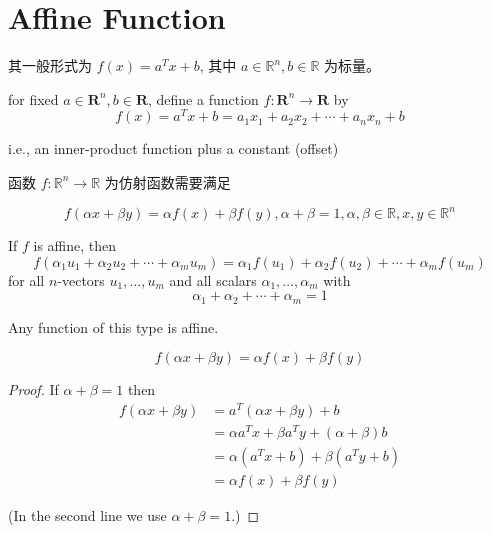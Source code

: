 \section{Affine Function}


\begin{definition}
    其一般形式为 $ f(x)=a^{T} x+{b} $, 其中 $ a \in \mathbb{R}^{n}, b \in \mathbb{R} $ 为标量。 

    
        for fixed $ a \in \mathbf{R}^{n}, b \in \mathbf{R} $, define a function $ f: \mathbf{R}^{n} \rightarrow \mathbf{R} $ by
    $$
    f(x)=a^{T} x+b=a_{1} x_{1}+a_{2} x_{2}+\cdots+a_{n} x_{n}+b
    $$
    
    i.e., an inner-product function plus a constant (offset)
    
\end{definition}

\begin{theorem}
    函数 $ f: \mathbb{R}^{n} \rightarrow \mathbb{R} $ 为仿射函数需要满足

$$ f(\alpha x+\beta y)=\alpha f(x)+\beta f(y), \alpha+\beta=1, \alpha, \beta \in \mathbb{R}, x, y \in \mathbb{R}^{n} $$
\end{theorem}

\begin{corollary}
    If $ f $ is affine, then
$$
f\left(\alpha_{1} u_{1}+\alpha_{2} u_{2}+\cdots+\alpha_{m} u_{m}\right)=\alpha_{1} f\left(u_{1}\right)+\alpha_{2} f\left(u_{2}\right)+\cdots+\alpha_{m} f\left(u_{m}\right)
$$
for all $ n $-vectors $ u_{1}, \ldots, u_{m} $ and all scalars $ \alpha_{1}, \ldots, \alpha_{m} $ with
$$
\alpha_{1}+\alpha_{2}+\cdots+\alpha_{m}=1
$$
\end{corollary}



\begin{theorem}
    Any function of this type is affine.
    
    $$ f(\alpha x+\beta y)=\alpha f(x)+\beta f(y) $$
\end{theorem}

\begin{proof}
    If $ \alpha+\beta=1 $ then
    $$ \begin{aligned} f(\alpha x+\beta y) &=a^{T}(\alpha x+\beta y)+b \\ &=\alpha a^{T} x+\beta a^{T} y+(\alpha+\beta) b \\ &=\alpha\left(a^{T} x+b\right)+\beta\left(a^{T} y+b\right) \\ &=\alpha f(x)+\beta f(y) \end{aligned} $$

    (In the second line we use $\alpha + \beta = 1$.)

\end{proof}

